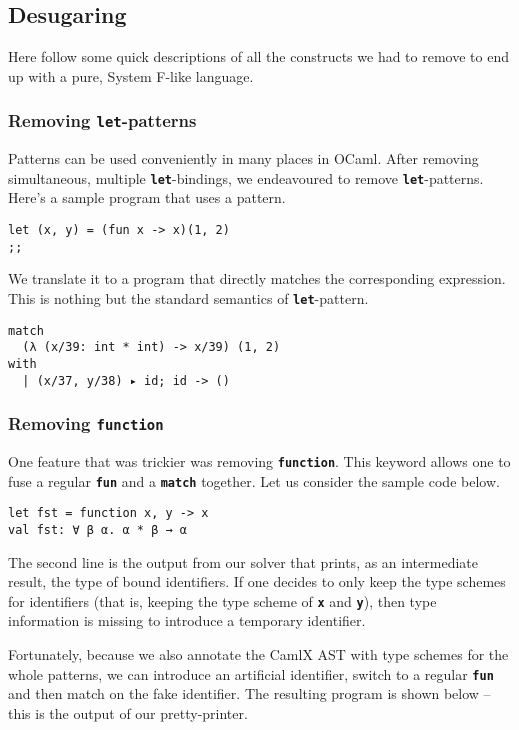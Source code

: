 \documentclass[10pt,a4paper,twoside,titlepage,twocolumn]{article}
\newcommand{\code}[1]{\textbf{\texttt{#1}}}
\begin{document}
\subsection{Desugaring}

Here follow some quick descriptions of all the constructs we had to remove to
end up with a pure, System F-like language.

\subsubsection{Removing \code{let}-patterns}

Patterns can be used conveniently in many places in OCaml. After removing
simultaneous, multiple \code{let}-bindings, we endeavoured to remove
\code{let}-patterns. Here's a sample program that uses a pattern.

\begin{verbatim}
let (x, y) = (fun x -> x)(1, 2)
;;
\end{verbatim}
We translate it to a program that directly matches the corresponding expression.
This is nothing but the standard semantics of \code{let}-pattern.
\begin{verbatim}
match
  (λ (x/39: int * int) -> x/39) (1, 2)
with
  | (x/37, y/38) ▸ id; id -> ()
\end{verbatim}

\subsubsection{Removing \code{function}}

One feature that was trickier was removing \code{function}. This keyword allows
one to fuse a regular \code{fun} and a \code{match} together. Let us consider
the sample code below.

\begin{verbatim}
let fst = function x, y -> x
val fst: ∀ β α. α * β → α
\end{verbatim}

The second line is the output from our solver that prints, as an intermediate
result, the type of bound identifiers. If one decides to only keep the type
schemes for identifiers (that is, keeping the type scheme of \code{x} and
\code{y}), then type information is missing to introduce a temporary identifier.

Fortunately, because we also annotate the CamlX AST with type schemes
for the whole patterns, we can introduce an artificial identifier, switch to a
regular \code{fun} and then match on the fake identifier. The resulting program
is shown below -- this is the output of our pretty-printer.
\end{document}
